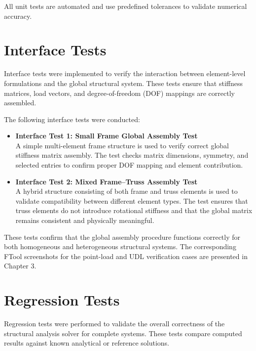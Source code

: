 All unit tests are automated and use predefined tolerances to validate numerical accuracy.

\section{Interface Tests}

Interface tests were implemented to verify the interaction between element-level formulations and the global structural system. These tests ensure that stiffness matrices, load vectors, and degree-of-freedom (DOF) mappings are correctly assembled.

The following interface tests were conducted:
\begin{itemize}
    \item \textbf{Interface Test 1: Small Frame Global Assembly Test} \\
    A simple multi-element frame structure is used to verify correct global stiffness matrix assembly. The test checks matrix dimensions, symmetry, and selected entries to confirm proper DOF mapping and element contribution.
    \item \textbf{Interface Test 2: Mixed Frame--Truss Assembly Test} \\
    A hybrid structure consisting of both frame and truss elements is used to validate compatibility between different element types. The test ensures that truss elements do not introduce rotational stiffness and that the global matrix remains consistent and physically meaningful.
\end{itemize}

These tests confirm that the global assembly procedure functions correctly for both homogeneous and heterogeneous structural systems.
The corresponding FTool screenshots for the point-load and UDL verification cases are presented in Chapter 3.

\section{Regression Tests}

Regression tests were performed to validate the overall correctness of the structural analysis solver for complete systems. These tests compare computed results against known analytical or reference solutions.

